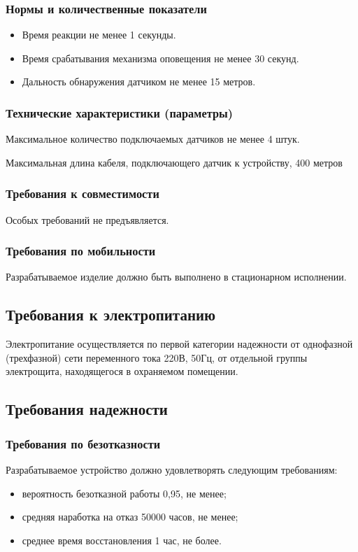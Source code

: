 			\subsubsection{Нормы и количественные показатели}
				\begin{itemize}
				\changefontsizes[14pt]{14pt}
					\item Время реакции не менее 1 секунды.
					\item Время срабатывания механизма оповещения не менее 30 секунд.
					\item Дальность обнаружения датчиком не менее 15 метров.
				\end{itemize}
			\subsubsection{Технические характеристики (параметры)}
				Максимальное количество подключаемых датчиков не менее 4 штук.

				Максимальная длина кабеля, подключающего датчик к устройству, 400 метров
			\subsubsection{Требования к совместимости}
				Особых требований не предъявляется.

			\subsubsection{Требования по мобильности}
				Разрабатываемое изделие должно быть выполнено в стационарном исполнении.
		\subsection{Требования к электропитанию}
			Электропитание осуществляется по первой категории надежности от однофазной (трехфазной) сети переменного тока 220В, 50Гц, от отдельной группы электрощита, находящегося в охраняемом помещении.
		\subsection{Требования надежности}
			\subsubsection{Требования по безотказности}
				Разрабатываемое устройство должно удовлетворять следующим требованиям:
				\begin{itemize}
				\changefontsizes[14pt]{14pt}
					\item вероятность безотказной работы 0,95, не менее;
					\item средняя наработка на отказ 50000 часов, не менее;
					\item среднее время восстановления 1 час, не более.
				\end{itemize}
